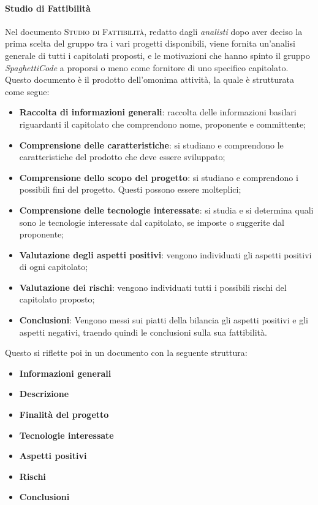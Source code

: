 \documentclass[../norme_di_progetto.tex]{subfiles}
\begin{document}
\paragraph{Studio di Fattibilità}
Nel documento \textsc{Studio di Fattibilità}, redatto dagli \emph{analisti} dopo aver deciso la prima scelta del gruppo tra i vari progetti disponibili, viene fornita un'analisi generale di tutti i capitolati proposti, e le motivazioni che hanno spinto il gruppo \emph{SpaghettiCode} a proporsi o meno come fornitore di uno specifico capitolato. Questo documento è il prodotto dell'omonima attività, la quale è strutturata come segue: 
\begin{itemize}
    \item \textbf{Raccolta di informazioni generali}: raccolta delle informazioni basilari riguardanti il capitolato che comprendono nome, proponente e committente;
    \item \textbf{Comprensione delle caratteristiche}: si studiano e comprendono le caratteristiche del prodotto che deve essere sviluppato;
    \item \textbf{Comprensione dello scopo del progetto}: si studiano e comprendono i possibili fini del progetto. Questi possono essere molteplici;
    \item \textbf{Comprensione delle tecnologie interessate}: si studia e si determina quali sono le tecnologie interessate dal capitolato, se imposte o suggerite dal proponente;
    \item \textbf{Valutazione degli aspetti positivi}: vengono individuati gli aspetti positivi di ogni capitolato;
    \item \textbf{Valutazione dei rischi}: vengono individuati tutti i possibili rischi del capitolato proposto;  
    \item \textbf{Conclusioni}: Vengono messi sui piatti della bilancia gli aspetti positivi e gli aspetti negativi, traendo quindi le conclusioni sulla sua fattibilità.
\end{itemize}
Questo si riflette poi in un documento con la seguente struttura:
\begin{itemize}
    \item \textbf{Informazioni generali}
    \item \textbf{Descrizione}
    \item \textbf{Finalità del progetto}
    \item \textbf{Tecnologie interessate}
    \item \textbf{Aspetti positivi}
    \item \textbf{Rischi}
    \item \textbf{Conclusioni}
\end{itemize}
\end{document}
